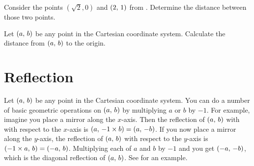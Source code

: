 \documentclass[a4paper,oneside,12pt]{article}
\begin{document}
\begin{exercise}
Consider the points $(\sqrt{2}\comma 0)$ and $\left\lparen{2},\, {1}\right\rparen$ from
.  Determine the distance
between those two points.
\end{exercise}


\begin{exercise}
Let $\left\lparen{a},\, {b}\right\rparen$ be any point in the Cartesian coordinate system.
Calculate the distance from $\left\lparen{a},\, {b}\right\rparen$ to the origin.
\end{exercise}




\section{Reflection}

Let $\left\lparen{a},\, {b}\right\rparen$ be any point in the Cartesian coordinate system.
You can do a number of basic geometric operations on $\left\lparen{a},\, {b}\right\rparen$ by
multiplying $a$ or $b$ by $-1$.  For example, imagine you place a
mirror along the $x$-axis.  Then the reflection of $\left\lparen{a},\, {b}\right\rparen$ with
with respect to the $x$-axis is
$\left\lparen{a},\, {-1 \times b}\right\rparen = \left\lparen{a},\, {-b}\right\rparen$.  If you now place a mirror
along the $y$-axis, the reflection of $\left\lparen{a},\, {b}\right\rparen$ with respect to
the $y$-axis is $\left\lparen{-1 \times a},\, {b}\right\rparen = \left\lparen{-a},\, {b}\right\rparen$.  Multiplying
each of $a$ and $b$ by $-1$ and you get $\left\lparen{-a},\, {-b}\right\rparen$, which is the
diagonal reflection of $\left\lparen{a},\, {b}\right\rparen$.  See
 for an example.
\end{document}
